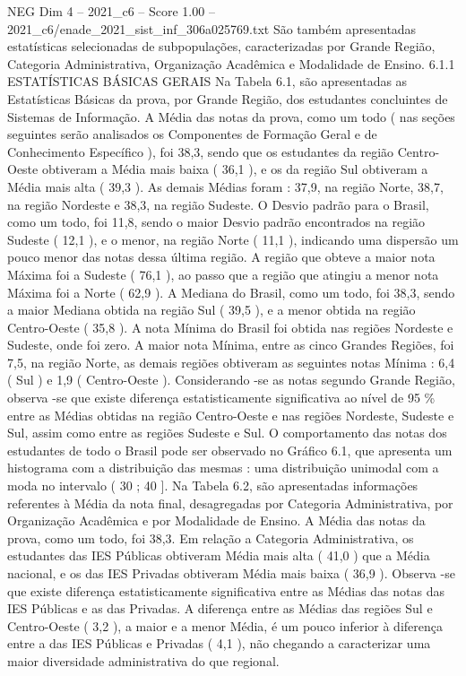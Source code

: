 \begin{textsample}{NEG Dim 4 – 2021\_c6 – Score 1.00 – 2021\_c6/enade\_2021\_sist\_inf\_306a025769.txt}
São também apresentadas estatísticas selecionadas de subpopulações, caracterizadas por Grande Região, Categoria Administrativa, Organização Acadêmica e Modalidade de Ensino. 6.1.1 ESTATÍSTICAS BÁSICAS GERAIS Na Tabela 6.1, são apresentadas as Estatísticas Básicas da prova, por Grande Região, dos estudantes concluintes de Sistemas de Informação.
A Média das notas da prova, como um todo ( nas seções seguintes serão analisados os Componentes de Formação Geral e de Conhecimento Específico ), foi 38,3, sendo que os estudantes da região Centro-Oeste obtiveram a Média mais baixa ( 36,1 ), e os da região Sul obtiveram a Média mais alta ( 39,3 ).
As demais Médias foram : 37,9, na região Norte, 38,7, na região Nordeste e 38,3, na região Sudeste.
O Desvio padrão para o Brasil, como um todo, foi 11,8, sendo o maior Desvio padrão encontrados na região Sudeste ( 12,1 ), e o menor, na região Norte ( 11,1 ), indicando uma dispersão um pouco menor das notas dessa última região.
A região que obteve a maior nota Máxima foi a Sudeste ( 76,1 ), ao passo que a região que atingiu a menor nota Máxima foi a Norte ( 62,9 ).
A Mediana do Brasil, como um todo, foi 38,3, sendo a maior Mediana obtida na região Sul ( 39,5 ), e a menor obtida na região Centro-Oeste ( 35,8 ).
A nota Mínima do Brasil foi obtida nas regiões Nordeste e Sudeste, onde foi zero.
A maior nota Mínima, entre as cinco Grandes Regiões, foi 7,5, na região Norte, as demais regiões obtiveram as seguintes notas Mínima : 6,4 ( Sul ) e 1,9 ( Centro-Oeste ).
Considerando -se as notas segundo Grande Região, observa -se que existe diferença estatisticamente significativa ao nível de 95 \% entre as Médias obtidas na região Centro-Oeste e nas regiões Nordeste, Sudeste e Sul, assim como entre as regiões Sudeste e Sul.
O comportamento das notas dos estudantes de todo o Brasil pode ser observado no Gráfico 6.1, que apresenta um histograma com a distribuição das mesmas : uma distribuição unimodal com a moda no intervalo ( 30 ; 40 ].
Na Tabela 6.2, são apresentadas informações referentes à Média da nota final, desagregadas por Categoria Administrativa, por Organização Acadêmica e por Modalidade de Ensino.
A Média das notas da prova, como um todo, foi 38,3.
Em relação a Categoria Administrativa, os estudantes das IES Públicas obtiveram Média mais alta ( 41,0 ) que a Média nacional, e os das IES Privadas obtiveram Média mais baixa ( 36,9 ).
Observa -se que existe diferença estatisticamente significativa entre as Médias das notas das IES Públicas e as das Privadas.
A diferença entre as Médias das regiões Sul e Centro-Oeste ( 3,2 ), a maior e a menor Média, é um pouco inferior à diferença entre a das IES Públicas e Privadas ( 4,1 ), não chegando a caracterizar uma maior diversidade administrativa do que regional.

\end{textsample}
